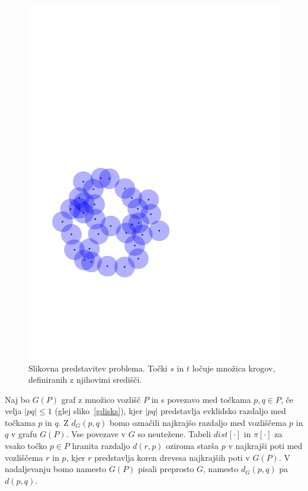 \documentclass[a4paper, 12pt]{book}
\begin{document}
\begin{figure}
\centerline{\includegraphics[scale=0.6,page=4]{pics/unitdisks.pdf}}
\caption{Slikovna predstavitev problema. Točki $s$ in $t$ ločuje množica krogov, definiranih z njihovimi središči.}
\label{separation}
\end{figure}

Naj bo $G(P)$ graf z množico vozlišč $P$ in s povezavo med točkama $p,q \in P$, če velja $|pq|\le 1$ (glej sliko~\ref{gdisks}), kjer $|pq|$ predstavlja evklidsko razdaljo med točkama $p$ in $q$. Z $d_G(p,q)$ bomo označili najkrajšo razdaljo med vozliščema $p$ in $q$ v grafu $G(P)$. Vse povezave v $G$ so neutežene. Tabeli $dist[\cdot]$ in $\pi[\cdot]$ za vsako točko $p\in P$ hranita razdaljo $d(r, p)$ oziroma starša $p$ v najkrajši poti med vozliščema $r$ in $p$, kjer $r$ predstavlja koren drevesa najkrajših poti v $G(P)$. V nadaljevanju bomo namesto $G(P)$ pisali preprosto $G$, namesto $d_G(p, q)$ pa $d(p, q)$.
\end{document}

